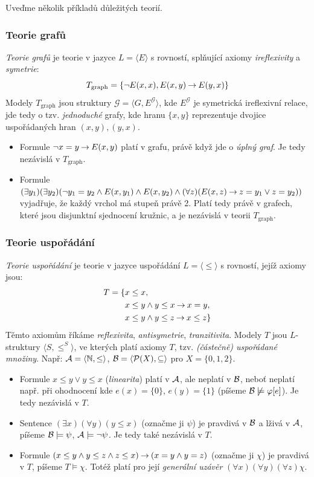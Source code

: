 Uveďme několik příkladů důležitých teorií.

\subsubsection{Teorie grafů}
\emph{Teorie grafů} je teorie v jazyce $L=\langle E\rangle$ s rovností, splňující axiomy \emph{ireflexivity} a \emph{symetrie}:
$$
T_\text{graph}=\{\neg E(x, x),E(x,y)\mathbin{\rightarrow} E(y,x)\}
$$
Modely $T_\text{graph}$ jsou struktury $\mathcal G=\langle G,E^\mathcal G\rangle$, kde $E^\mathcal G$ je symetrická ireflexivní relace, jde tedy o tzv. \emph{jednoduché} grafy, kde hranu $\{x,y\}$ reprezentuje dvojice uspořádaných hran $(x,y),(y,x)$.
\begin{itemize}
    \item Formule $\neg x=y\mathbin{\rightarrow} E(x,y)$ platí v grafu, právě když jde o \emph{úplný graf}. Je tedy nezávislá v $T_\text{graph}$.
    \item Formule $(\exists y_1)(\exists y_2)(\neg y_1=y_2\land E(x,y_1)\land E(x,y_2)\land (\forall z)(E(x,z)\mathbin{\rightarrow} z=y_1\lor z=y_2))$ vyjadřuje, že každý vrchol má stupeň právě 2. Platí tedy právě v grafech, které jsou disjunktní sjednocení kružnic, a je nezávislá v teorii $T_\text{graph}$.
\end{itemize}


\subsubsection{Teorie uspořádání}

\emph{Teorie uspořádání} je teorie v jazyce uspořádání $L=\langle\leq\rangle$ s rovností, jejíž axiomy jsou:
\begin{align*}
    T=\{& x\leq x,\\
        & x\leq y\land y\leq x\mathbin{\rightarrow} x=y,\\
        & x\leq y\land y\leq z\mathbin{\rightarrow} x\leq z\}\\
\end{align*}
Těmto axiomům říkáme \emph{reflexivita}, \emph{antisymetrie}, \emph{tranzitivita}. Modely $T$ jsou $L$-struktury $\langle S,\leq^S\rangle$, ve kterých platí axiomy $T$, tzv. \emph{(částečně) uspořádané množiny}. Např: $\mathcal{A}=\langle\mathbb N,\leq\rangle$, $\mathcal{B}=\langle\mathcal P(X),\subseteq\rangle$ pro $X=\{0,1,2\}$.
\begin{itemize}
    \item Formule $x\leq y\lor y\leq x$ (\emph{linearita}) platí v $\mathcal{A}$, ale neplatí v $\mathcal{B}$, neboť neplatí např. při ohodnocení kde $e(x)=\{0\}$, $e(y)=\{1\}$ (píšeme $\mathcal{B}\not\models\varphi[e]$). Je tedy nezávislá v $T$.
    \item Sentence $(\exists x)(\forall y)(y\leq x)$ (označme ji $\psi$) je pravdivá v $\mathcal{B}$ a lživá v $\mathcal{A}$, píšeme $\mathcal{B}\models\psi$, $\mathcal{A}\models\neg\psi$. Je tedy také nezávislá v $T$.
    \item Formule $(x\leq y\land y\leq z\land z\leq x)\mathbin{\rightarrow} (x=y\land y=z)$ (označme ji $\chi$) je pravdivá v $T$, píšeme $T\models\chi$. Totéž platí pro její \emph{generální uzávěr} $(\forall x)(\forall y)(\forall z)\chi$.
\end{itemize}

